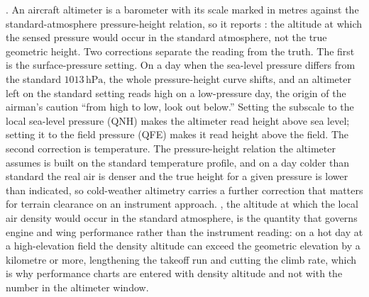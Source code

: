 . An aircraft altimeter is
a barometer with its scale marked in metres against the standard-atmosphere
pressure-height relation, so it reports : the
altitude at which the sensed pressure would occur in the standard
atmosphere, not the true geometric height. Two corrections separate the
reading from the truth. The first is the surface-pressure setting. On a day
when the sea-level pressure differs from the standard $1013\,\text{hPa}$,
the whole pressure-height curve shifts, and an altimeter left on the
standard setting reads high on a low-pressure day, the origin of the
airman's caution ``from high to low, look out below.'' Setting the
subscale to the local sea-level pressure (QNH) makes the altimeter read
height above sea level; setting it to the field pressure (QFE) makes it
read height above the field. The second correction is temperature. The
pressure-height relation the altimeter assumes is built on the standard
temperature profile, and on a day colder than standard the real air is
denser and the true height for a given pressure is lower than indicated,
so cold-weather altimetry carries a further correction that matters for
terrain clearance on an instrument approach. ,
the altitude at which the local air density would occur in the standard
atmosphere, is the quantity that governs engine and wing performance
rather than the instrument reading: on a hot day at a high-elevation field
the density altitude can exceed the geometric elevation by a kilometre or
more, lengthening the takeoff run and cutting the climb rate, which is why
performance charts are entered with density altitude and not with the
number in the altimeter window.

